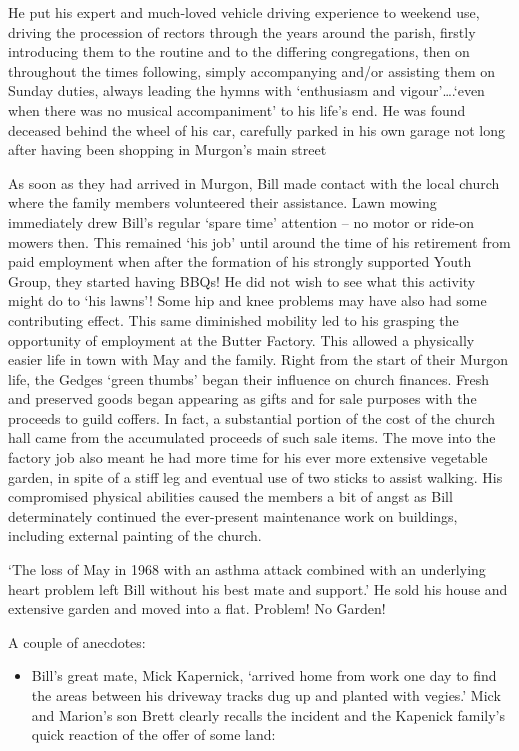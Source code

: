 He put his expert and much-loved vehicle driving experience to weekend
use, driving the procession of rectors through the years around the
parish, firstly introducing them to the routine and to the differing
congregations, then on throughout the times following, simply
accompanying and/or assisting them on Sunday duties, always leading the
hymns with `enthusiasm and vigour'\ldots.`even when there was no musical
accompaniment' to his life's end. He was found deceased behind the wheel
of his car, carefully parked in his own garage not long after having
been shopping in Murgon's main street

As soon as they had arrived in Murgon, Bill made contact with the local
church where the family members volunteered their assistance. Lawn
mowing immediately drew Bill's regular `spare time' attention -- no
motor or ride-on mowers then. This remained `his job' until around the
time of his retirement from paid employment when after the formation of
his strongly supported Youth Group, they started having BBQs! He did not
wish to see what this activity might do to `his lawns'! Some hip and
knee problems may have also had some contributing effect. This same
diminished mobility led to his grasping the opportunity of employment at
the Butter Factory. This allowed a physically easier life in town with
May and the family. Right from the start of their Murgon life, the
Gedges `green thumbs' began their influence on church finances. Fresh
and preserved goods began appearing as gifts and for sale purposes with
the proceeds to guild coffers. In fact, a substantial portion of the
cost of the church hall came from the accumulated proceeds of such sale
items. The move into the factory job also meant he had more time for his
ever more extensive vegetable garden, in spite of a stiff leg and
eventual use of two sticks to assist walking. His compromised physical
abilities caused the members a bit of angst as Bill determinately
continued the ever-present maintenance work on buildings, including
external painting of the church.

`The loss of May in 1968 with an asthma attack combined with an
underlying heart problem left Bill without his best mate and support.'
He sold his house and extensive garden and moved into a flat. Problem!
No Garden!

A couple of anecdotes:

\begin{itemize}
\item
  Bill's great mate, Mick Kapernick, `arrived home from work one day to
  find the areas between his driveway tracks dug up and planted with
  vegies.' Mick and Marion's son Brett clearly recalls the incident and
  the Kapenick family's quick reaction of the offer of some land:
\end{itemize}

